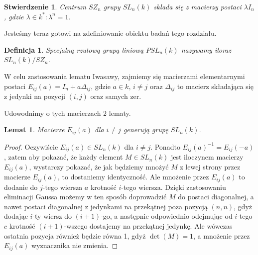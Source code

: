 \documentclass[licencjacka]{pracamgr}
\newtheorem{deff}{Definicja}[section]
\newtheorem{lemma}{Lemat}[section]
\newtheorem{fact}{Stwierdzenie}[section]
\begin{document}
\begin{fact}
  Centrum $SZ_n$ grupy $SL_n(k)$ składa się z macierzy postaci $\lambda I_n$, 
  gdzie $\lambda \in k^* \colon \lambda^n = 1$.
\end{fact}

Jesteśmy teraz gotowi na zdefiniowanie obiektu badań tego rozdziału.

\begin{deff}
  \emph{Specjalną rzutową grupą liniową $PSL_n(k)$} nazywamy iloraz $SL_n(k) / SZ_n$.
\end{deff}



W celu zastosowania lematu Iwasawy, zajmiemy się macierzami elementarnymi postaci
$E_{i j} (a) = I_n + a \Delta_{i j}$, gdzie $a \in k$, $i \ne j$ oraz 
$\Delta_{i j}$ to macierz składająca się z jedynki na pozycji $(i, j)$ oraz samych zer.

Udowodnimy o tych macierzach 2 lematy.

\begin{lemma}\label{lemma_Eij_generates_SL}
  Macierze $E_{i j}(a)$ dla $i \ne j$ generują grupę $SL_n(k)$.
\end{lemma}
\begin{proof}
  Oczywiście $E_{i j}(a) \in SL_n(k)$ dla $i \ne j$. 
  Ponadto $E_{i j}(a)^{-1} = E_{i j}(-a)$, zatem aby pokazać, że każdy element $M \in SL_n(k)$ jest iloczynem macierzy $E_{i j}(a)$,
  wystarczy pokazać, że jak będziemy mnożyć $M$ z lewej strony przez macierze $E_{i j}(a)$, to dostaniemy identyczność.
  Ale mnożenie przez $E_{i j}(a)$ to dodanie do $j$-tego wiersza $a$ krotność $i$-tego wiersza.
  Dzięki zastosowaniu eliminacji Gaussa możemy w ten sposób doprowadzić $M$ do postaci diagonalnej,
  a nawet postaci diagonalnej z jedynkami na przekątnej poza pozycją $(n, n)$, gdyż dodając $i$-ty wiersz do $(i+1)$-go, a następnie odpowiednio
  odejmując od $i$-tego $c$ krotność $(i+1)$-wszego dostajemy na przekątnej jedynkę. Ale wówczas ostatnia pozycja również będzie równa 1, 
  gdyż $\det(M) = 1$, a mnożenie przez $E_{i j}(a)$ wyznacznika nie zmienia.
\end{proof}
\end{document}
